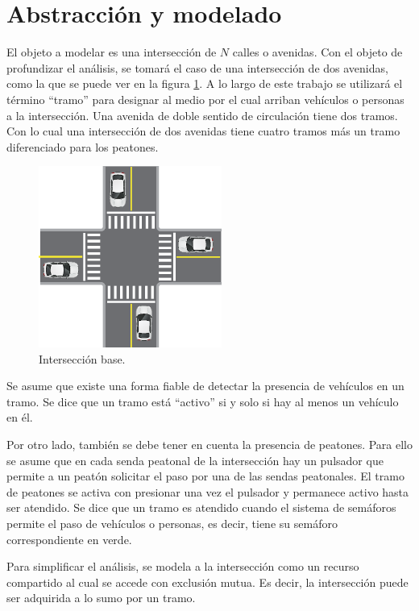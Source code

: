 \lstset {
tabsize=2,
basicstyle=\footnotesize\ttfamily,breaklines=true
}

\section{Abstracción y modelado}

El objeto a modelar es una intersección de $N$ calles o avenidas.
Con el objeto de profundizar el análisis, se tomará el caso de una intersección de dos avenidas, como la que se puede ver en la figura \ref{fig:interseccion-base}.
A lo largo de este trabajo se utilizará el término \enquote{tramo} para designar al medio por el cual arriban vehículos o personas a la intersección.
Una avenida de doble sentido de circulación tiene dos tramos.
Con lo cual una intersección de dos avenidas tiene cuatro tramos más un tramo diferenciado para los peatones.

\begin{figure}[htbp]
	\centering
	\includegraphics[width=6cm]{imagenes/interseccion-base.eps}
	\caption{Intersección base.}
	\label{fig:interseccion-base}
\end{figure}

Se asume que existe una forma fiable de detectar la presencia de vehículos en un tramo.
Se dice que un tramo está \enquote{activo} si y solo si hay al menos un vehículo en él.

Por otro lado, también se debe tener en cuenta la presencia de peatones.
Para ello se asume que en cada senda peatonal de la intersección hay un pulsador que permite a un peatón solicitar el paso por una de las sendas peatonales.
El tramo de peatones se activa con presionar una vez el pulsador y permanece activo hasta ser atendido.
Se dice que un tramo es atendido cuando el sistema de semáforos permite el paso de vehículos o personas, es decir, tiene su semáforo correspondiente en verde.

Para simplificar el análisis, se modela a la intersección como un recurso compartido al cual se accede con exclusión mutua.
Es decir, la intersección puede ser adquirida a lo sumo por un tramo.



